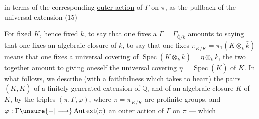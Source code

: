 in terms of  the corresponding \uline{outer action} of $\Gamma$ on $\pi$, as the pullback of the universal extension
\noindent (15)\quad{}

For fixed $K$, hence fixed $k$, to say that one fixes a $\Gamma=\Gamma_{\overline{\mathbb Q}/k}$ amounts to saying that one fixes an algebraic closure of $k$, to say that one fixes  $\pi_{\bar K/K}=\pi_1(K\otimes_k\bar k)$ means  that one fixes a universal covering of $\operatorname{Spec}(K\otimes_k\bar k)=\eta\otimes_k\bar k$,  the two together amount to giving oneself the universal covering  $\bar\eta=\operatorname{Spec}(\bar K)$ of $K$. In what follows, we describe (with a faithfulness which takes to heart) the pairs $(K,\bar K)$ of a finitely generated extension of $\mathbb Q$, and of an algebraic closure $\bar K$ of $K$, by the triples $(\pi,\Gamma,\varphi)$, where $\pi=\pi_{\bar K/K}$  are profinite groups, and $\varphi:\Gamma\unsure{-|\longrightarrow}\operatorname{Aut\,ext}(\pi)$ an outer action of $\Gamma$ on $\pi$ --- which
